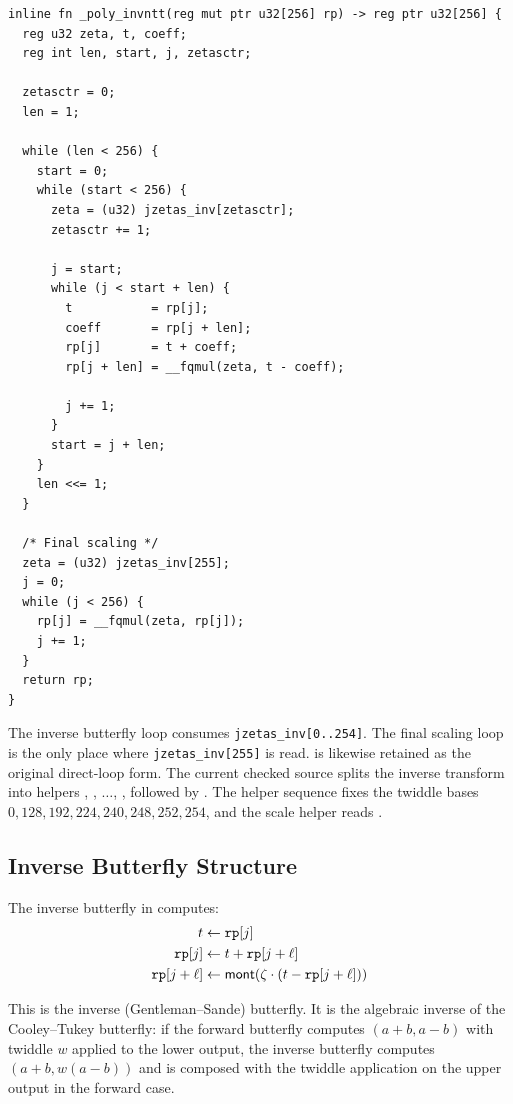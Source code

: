 \begin{lstlisting}[language=Jasmin,
  caption={Original direct inverse NTT kernel in \texttt{poly.jinc} (condensed)},
  label={lst:invntt_jasmin}]
inline fn _poly_invntt(reg mut ptr u32[256] rp) -> reg ptr u32[256] {
  reg u32 zeta, t, coeff;
  reg int len, start, j, zetasctr;

  zetasctr = 0;
  len = 1;

  while (len < 256) {
    start = 0;
    while (start < 256) {
      zeta = (u32) jzetas_inv[zetasctr];
      zetasctr += 1;

      j = start;
      while (j < start + len) {
        t           = rp[j];
        coeff       = rp[j + len];
        rp[j]       = t + coeff;
        rp[j + len] = __fqmul(zeta, t - coeff);

        j += 1;
      }
      start = j + len;
    }
    len <<= 1;
  }

  /* Final scaling */
  zeta = (u32) jzetas_inv[255];
  j = 0;
  while (j < 256) {
    rp[j] = __fqmul(zeta, rp[j]);
    j += 1;
  }
  return rp;
}
\end{lstlisting}

The inverse butterfly loop consumes \texttt{jzetas\_inv[0..254]}.  The final
scaling loop is the only place where \texttt{jzetas\_inv[255]} is read.
 is likewise retained as the original direct-loop
form.  The current checked source splits the inverse transform into helpers
, , \(\ldots\),
, followed by .
The helper sequence fixes the twiddle bases
\(0,128,192,224,240,248,252,254\), and the scale helper reads
.

\subsection{Inverse Butterfly Structure}

The inverse butterfly in \jasmin{} computes:
\begin{align*}
  t &\gets \texttt{rp}[j] \\
  \texttt{rp}[j] &\gets t + \texttt{rp}[j+\ell] \\
  \texttt{rp}[j+\ell] &\gets \mathsf{mont}(\zeta \cdot (t - \texttt{rp}[j+\ell]))
\end{align*}

This is the inverse (Gentleman--Sande) butterfly.  It is the algebraic inverse
of the Cooley--Tukey butterfly: if the forward butterfly computes $(a+b, a-b)$
with twiddle $w$ applied to the lower output, the inverse butterfly computes
$(a+b, w(a-b))$ and is composed with the twiddle application on the upper
output in the forward case.

